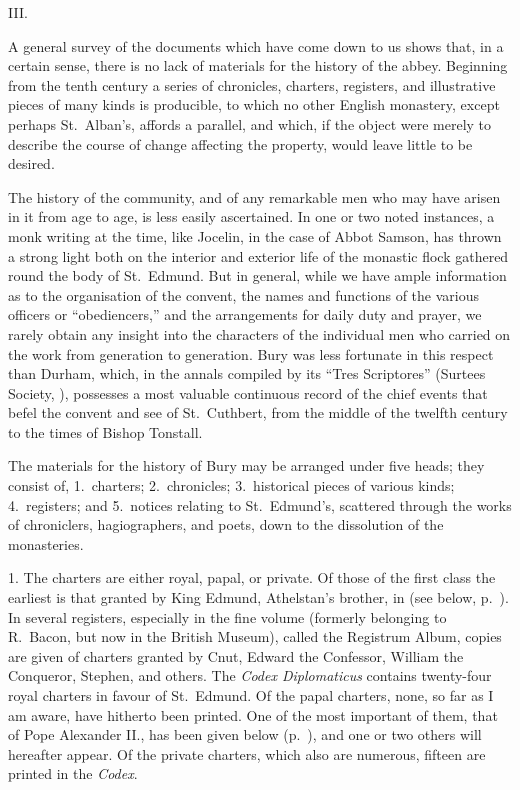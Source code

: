 \documentclass[10pt]{book}
\begin{document}
{\vspace{.3cm}
\begin{center}
III.
\end{center}
\noindent A general survey of the documents which have come down to us shows that, in a certain sense, there is no lack of materials for the history of the abbey. Beginning from the tenth century a series of chronicles, charters, registers, and illustrative pieces of many kinds is producible, to which no other English monastery, except perhaps St.\ Alban's, affords a parallel, and which, if the object were merely to describe the course of change affecting the property, would leave little to be desired.

The history of the community, and of any remarkable men who may have arisen in it from age to age, is less easily ascertained. In one or two noted instances, a monk writing at the time, like Jocelin, in the case of Abbot Samson, has thrown a strong light both on the interior and exterior life of the monastic flock gathered round the body of St.\ Edmund. But in general, while we have ample information as to the organisation of the convent, the names and functions of the various officers or ``obediencers,'' and the arrangements for daily duty and prayer, we rarely obtain any insight into the characters of the individual men who carried on the work from generation to generation. Bury was less fortunate in this respect than Durham, which, in the annals compiled by its ``Tres Scriptores'' (Surtees Society, ), possesses a most valuable continuous record of the chief events that befel the convent and see of St.\ Cuthbert, from the middle of the twelfth century to the times of Bishop Tonstall.

The materials for the history of Bury may be arranged under five heads; they consist of, 1.\ charters; 2.\ chronicles; 3.\ historical pieces of various kinds; 4.\ registers; and 5.\ notices relating to St.\ Edmund's, scattered through the works of chroniclers, hagiographers, and poets, down to the dissolution of the monasteries.

1. The charters are either royal, papal, or private. Of those of the first class the earliest is that granted by King Edmund, Athelstan's brother, in  (see below, p.\ ). In several registers, especially in the fine volume (formerly belonging to R.\ Bacon, but now in the British Museum), called the Registrum Album, copies are given of charters granted by Cnut, Edward the Confessor, William the Conqueror, Stephen, and others. The \emph{Codex Diplomaticus} contains twenty-four royal charters in favour of St.\ Edmund. Of the papal charters, none, so far as I am aware, have hitherto been printed. One of the most important of them, that of Pope Alexander II., has been given below (p.\ ), and one or two others will hereafter appear. Of the private charters, which also are numerous, fifteen are printed in the \emph{Codex}.

}
\end{document}
